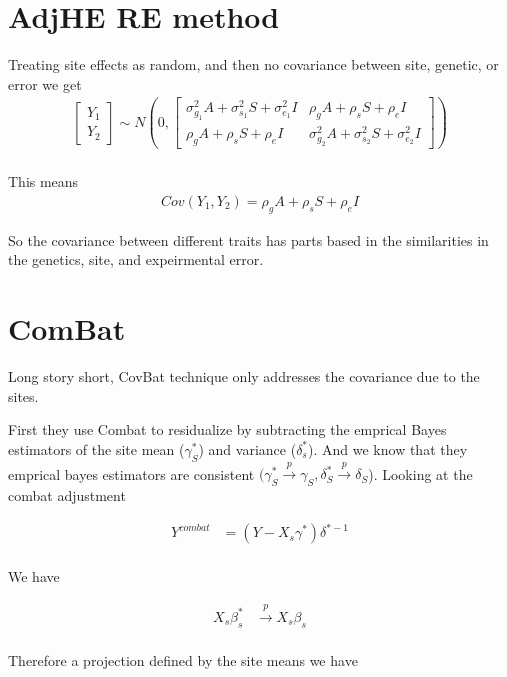 \documentclass[10pt,a4paper]{article}
\begin{document}
\section{AdjHE RE method}

Treating site effects as random, and then no covariance between site, genetic, or error we get
\begin{align*}
	\begin{bmatrix}
	Y_1\\
	Y_2 
	\end{bmatrix}\sim N(0,
	\begin{bmatrix}
	\sigma_{g_1}^2A + \sigma_{s_1}^2S + \sigma_{e_1}^2I & \rho_gA + \rho_sS + \rho_e I\\
	\rho_gA + \rho_sS + \rho_eI & \sigma_{g_2}^2A + \sigma_{s_2}^2S + \sigma_{e_2}^2I
	\end{bmatrix}) \\
\end{align*}

This means
\begin{align*}
	Cov(Y_1, Y_2) = \rho_gA + \rho_sS + \rho_eI
\end{align*}

So the covariance between different traits has parts based in the similarities in the genetics, site, and expeirmental error.


\section{ComBat}
Long story short, CovBat technique only addresses the covariance due to the sites. 

First they use Combat to residualize by subtracting the emprical Bayes estimators of the site mean ($\gamma_S^*$) and variance ($\delta_s^*$). And we know that they emprical bayes estimators are consistent $(\gamma_S^* \stackrel{p}{\to} \gamma_S, \delta_S^* \stackrel{p}{\to} \delta_S$). Looking at the combat adjustment

\begin{align*}
	Y^{combat} & = (Y- X_s\gamma^*)\delta^{*-1} \\
\end{align*} 

We have 

\begin{align*}
	X_s\beta_s^* & \stackrel{p}{\to} X_s\beta_s \\
\end{align*}

Therefore a projection defined by the site means we have
\end{document}
